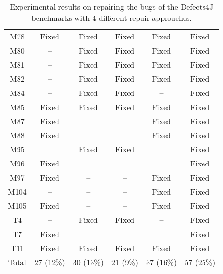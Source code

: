 \begin{table}[!t]
{\begin{tabular}{|c|c|c|c|c|c|}
M78               & Fixed     & Fixed     & Fixed     & Fixed     &Fixed   \\
M80               & --        & Fixed     & Fixed     & Fixed     &Fixed   \\
M81               & --        & Fixed     & Fixed     & Fixed     &Fixed   \\
M82               & --        & Fixed     & Fixed     & Fixed     &Fixed   \\
M84               & --        & Fixed     & Fixed     & --        &Fixed   \\
M85               & Fixed     & Fixed     & Fixed     & Fixed     &Fixed   \\
M87               & Fixed     & --        & --        & Fixed     &Fixed   \\
M88               & Fixed     & --        & --        & Fixed     &Fixed   \\
M95               & --        & Fixed     & Fixed     & --        &Fixed   \\
M96               & Fixed     & --        & --        & --        &Fixed   \\
M97               & Fixed     & --        & --        & Fixed     &Fixed   \\
M104              & --        & --        & --        & Fixed     &Fixed   \\
M105              & Fixed     & --        & --        & Fixed     &Fixed   \\
\hline
T4                & --        & Fixed     & Fixed     & --        &Fixed   \\
T7                & Fixed     & --        & --        & --        &Fixed   \\
T11               & Fixed     & Fixed     & Fixed     & Fixed     &Fixed   \\
\hline
Total             & 27 (12\%) & 30 (13\%) & 21 (9\%)  & 37 (16\%) & 57 (25\%)\\
\hline 
\end{tabular}%
}
\caption{Experimental results on repairing the bugs of the Defects4J benchmarks with 4 different repair approaches.}
\end{table}

